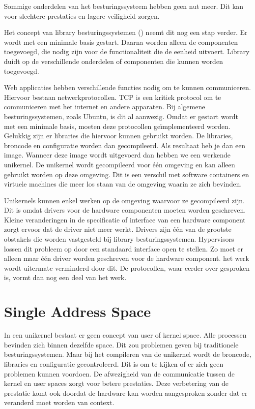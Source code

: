 Sommige onderdelen van het besturingssysteem hebben geen nut meer. Dit kan voor slechtere prestaties en lagere veiligheid zorgen.

Het concept van library besturingssystemen (\cite{madhavapeddy_unikernels_2013}) neemt dit nog een stap verder. Er wordt met een minimale basis gestart. Daarna worden alleen de componenten toegevoegd, die nodig zijn voor de functionaliteit die de eenheid uitvoert. Library duidt op de verschillende onderdelen of componenten die kunnen worden toegevoegd.

Web applicaties hebben verschillende functies nodig om te kunnen communiceren. Hiervoor bestaan netwerkprotocollen. TCP is een kritiek protocol om te communiceren met het internet en andere apparaten. Bij algemene besturingssystemen, zoals Ubuntu, is dit al aanwezig. Omdat er gestart wordt met een minimale basis, moeten deze protocollen geïmplementeerd worden. Gelukkig zijn er libraries die hiervoor kunnen gebruikt worden. De libraries, broncode en configuratie worden dan gecompileerd. Als resultaat heb je dan een image. Wanneer deze image wordt uitgevoerd dan hebben we een werkende unikernel. De unikernel wordt gecompileerd voor één omgeving en kan alleen gebruikt worden op deze omgeving. Dit is een verschil met software containers en virtuele machines die meer los staan van de omgeving waarin ze zich bevinden.

Unikernels kunnen enkel werken op de omgeving waarvoor ze gecompileerd zijn. Dit is omdat drivers voor de hardware componenten moeten worden geschreven. Kleine veranderingen in de specificatie of interface van een hardware component zorgt ervoor dat de driver niet meer werkt. Drivers zijn één van de grootste obstakels die worden vastgesteld bij library besturingssystemen. Hypervisors lossen dit probleem op door een standaard interface open te stellen. Zo moet er alleen maar één driver worden geschreven voor de hardware component. het werk wordt uitermate verminderd door dit. De protocollen, waar eerder over gesproken is, vormt dan nog een deel van het werk.

\section{Single Address Space}

In een unikernel bestaat er geen concept van user of kernel space. Alle processen bevinden zich binnen dezelfde space. Dit zou problemen geven bij traditionele besturingssystemen. Maar bij het compileren van de unikernel wordt de broncode, libraries en configuratie gecontroleerd. Dit is om te kijken of er zich geen problemen kunnen voordoen. De afwezigheid van de communicatie tussen de kernel en user spaces zorgt voor betere prestaties. Deze verbetering van de prestatie komt ook doordat de hardware kan worden aangesproken zonder dat er veranderd moet worden van context.

